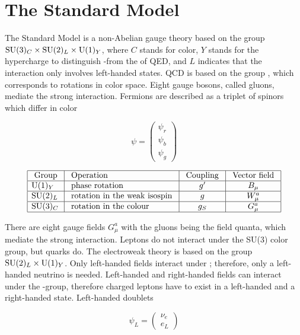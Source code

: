 \section{The Standard Model}
The Standard Model is a non-Abelian gauge theory based on the group $\text{SU}(3)_{C} \times \text{SU}(2)_{L} \times \text{U}(1)_{Y}$, where $C$ stands for color, $Y$ stands for the hypercharge to distinguish \hyp from the \uone of QED, and $L$ indicates that the interaction only involves left-handed states. QCD is based on the group \col, which corresponds to rotations in color space. Eight gauge bosons, called gluons, mediate the strong interaction. Fermions are described as a triplet of spinors which differ in color

\begin{equation}
  \psi=\left(\begin{array}{l}
  \psi_{r} \\
  \psi_{b} \\
  \psi_{g}
  \end{array}\right)
\end{equation}

\begin{equation}
  \begin{array}{|l|l|c|c|}
    \hline \text { Group } & \text { Operation } & \text { Coupling } & \text { Vector field } \\
    \hline \text{U}(1)_{Y} & \text { phase rotation } & g^{\prime} & B_{\mu} \\
    \hline \text{SU}(2)_{L} & \text { rotation in the weak isospin } & g & W_{\mu}^{a} \\
    \hline \text{SU}(3)_{C} & \text { rotation in the colour } & g_{S} & G_{\mu}^{a} \\
    \hline
  \end{array}
\end{equation}

There are eight gauge fields $G_{\mu}^{a}$ with the gluons being the field quanta, which mediate the strong interaction. Leptons do not interact under the SU(3) color group, but quarks do. The electroweak theory is based on the group $\text{SU}(2)_{L} \times \text{U}(1)_{Y}$. Only left-handed fields interact under \iso; therefore, only a left-handed neutrino is needed. Left-handed and right-handed fields can interact under the \hyp group, therefore charged leptons have to exist in a left-handed and a right-handed state. Left-handed \iso doublets

\begin{equation}
  \psi_{L}=\left(\begin{array}{l}
  \nu_{e} \\
  e_{L}
  \end{array}\right)
\end{equation}

